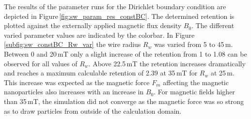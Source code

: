 The results of the parameter runs for the Dirichlet boundary condition are depicted in Figure\,\ref{fig:sw_param_res_constBC}. The determined retention is plotted against the externally applied magnetic flux density $B_{0}$. The different varied parameter values are indicated by the colorbar. In Figure\, \ref{subfig:sw_constBC_Rw_var} the wire radius $R_{w}$ was varied from 5 to 45\,\textmu m. Between 0 and 20\,mT only a slight increase of the retention from 1 to 1.08 can be observed for all values of $R_{w}$. Above 22.5\,mT the retention increases dramatically and reaches a maximum calculable retention of 2.39 at 35\,mT for $R_{w}$ at 25\,\textmu m. This increase was expected as the magnetic force $F_{m}$    
affecting the magnetic nanoparticles also increases with an increase in $B_{0}$. For magnetic fields higher than 35\,mT, the simulation did not converge as the magnetic force was so strong as to draw particles from outside of the calculation domain. 

